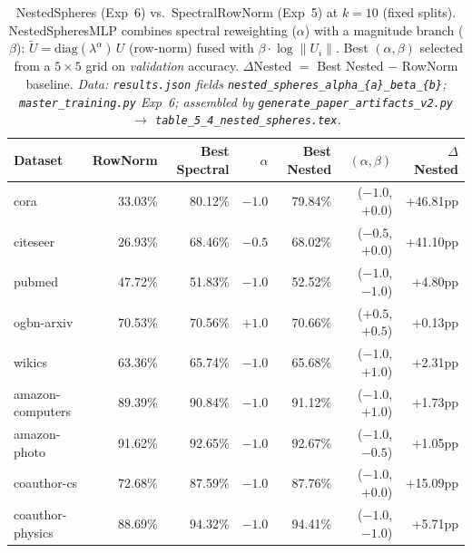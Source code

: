\documentclass[11pt]{article}
\begin{document}
\begin{table}[H]
\centering\small
\caption{NestedSpheres (Exp~6) vs.\ SpectralRowNorm (Exp~5) at $k{=}10$ (fixed splits).
NestedSpheresMLP combines spectral reweighting ($\alpha$) with a magnitude branch ($\beta$):
$\tilde{U} = \mathrm{diag}(\lambda^\alpha)\,U$ (row-norm) fused with $\beta \cdot \log\|U_i\|$.
Best $(\alpha,\beta)$ selected from a $5{\times}5$ grid on \emph{validation} accuracy.
$\Delta$Nested $=$ Best Nested $-$ RowNorm baseline.
\textit{\scriptsize Data: \texttt{results.json} fields \texttt{nested\_spheres\_alpha\_\{a\}\_beta\_\{b\}};
\texttt{master\_training.py} Exp~6;
assembled by \texttt{generate\_paper\_artifacts\_v2.py} $\to$ \texttt{table\_5\_4\_nested\_spheres.tex}.}}
\label{tab:nested_spheres}
\begin{tabular}{lrrrrrr}
\toprule
Dataset & RowNorm & Best Spectral & $\alpha$ & Best Nested & $(\alpha,\beta)$ & $\Delta$Nested \\
\midrule
cora             & 33.03\% & 80.12\% & $-1.0$ & 79.84\% & ($-1.0$, $+0.0$) & +46.81pp \\
citeseer         & 26.93\% & 68.46\% & $-0.5$ & 68.02\% & ($-0.5$, $+0.0$) & +41.10pp \\
pubmed           & 47.72\% & 51.83\% & $-1.0$ & 52.52\% & ($-1.0$, $-1.0$) & +4.80pp  \\
ogbn-arxiv       & 70.53\% & 70.56\% & $+1.0$ & 70.66\% & ($+0.5$, $+0.5$) & +0.13pp  \\
wikics           & 63.36\% & 65.74\% & $-1.0$ & 65.68\% & ($-1.0$, $+1.0$) & +2.31pp  \\
amazon-computers & 89.39\% & 90.84\% & $-1.0$ & 91.12\% & ($-1.0$, $+1.0$) & +1.73pp  \\
amazon-photo     & 91.62\% & 92.65\% & $-1.0$ & 92.67\% & ($-1.0$, $-0.5$) & +1.05pp  \\
coauthor-cs      & 72.68\% & 87.59\% & $-1.0$ & 87.76\% & ($-1.0$, $+0.0$) & +15.09pp \\
coauthor-physics & 88.69\% & 94.32\% & $-1.0$ & 94.41\% & ($-1.0$, $-1.0$) & +5.71pp  \\
\bottomrule
\end{tabular}
\end{table}
\end{document}
